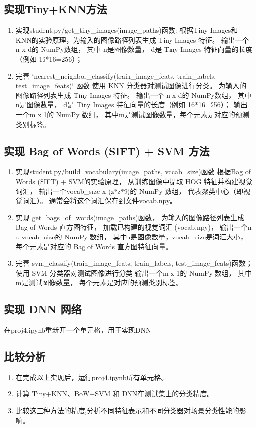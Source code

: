 \subsection{实现Tiny+KNN方法}
	\begin{enumerate}
		\item 实现student.py/get_tiny_images(image_paths)函数: 
		根据Tiny Images和KNN的实验原理，为输入的图像路径列表生成 Tiny Images 特征。
		输出一个 n x d的 NumPy数组，
		其中 n是图像数量，
		d是 Tiny Images 特征向量的长度（例如 16*16=256）；

		\item 完善 `nearest_neighbor_classify(train_image_feats, train_labels, test_image_feats)` 函数
		使用 KNN 分类器对测试图像进行分类。
		为输入的图像路径列表生成 Tiny Images 特征。
		输出一个 n x d的 NumPy数组，
		其中 n是图像数量，
		d是 Tiny Images 特征向量的长度（例如 16*16=256）；
		输出一个m x 1的 NumPy 数组，
		其中m是测试图像数量，每个元素是对应的预测类别标签。

	\end{enumerate}


\subsection{实现 Bag of Words (SIFT) + SVM 方法}
	\begin{enumerate}
		\item 实现student.py/build_vocabulary(image_paths, vocab_size)函数
		根据Bag of Words (SIFT) + SVM的实验原理，
		从训练图像中提取 HOG 特征并构建视觉词汇，
		输出一个vocab_size x (z*z*9)的 NumPy 数组，
		代表聚类中心（即视觉词汇）。
		通常会将这个词汇保存到文件vocab.npy。

		\item 实现 get_bags_of_words(image_paths)函数，
		为输入的图像路径列表生成 Bag of Words 直方图特征，
		加载已构建的视觉词汇 (vocab.npy)，
		输出一个n x vocab_size的 NumPy 数组，
		其中n是图像数量，vocab_size是词汇大小，
		每个元素是对应的 Bag of Words 直方图特征向量。

		\item 完善 svm_classify(train_image_feats, train_labels, test_image_feats)函数；
		使用 SVM 分类器对测试图像进行分类
		输出一个m x 1的 NumPy 数组，
		其中m是测试图像数量，
		每个元素是对应的预测类别标签。
	\end{enumerate}


\subsection{实现 DNN 网络}
在proj4.ipynb重新开一个单元格，用于实现DNN

\subsection{比较分析}
	\begin{enumerate}
		\item 在完成以上实现后，运行proj4.ipynb所有单元格。
		\item 计算 Tiny+KNN、BoW+SVM 和 DNN在测试集上的分类精度。
		\item 比较这三种方法的精度,分析不同特征表示和不同分类器对场景分类性能的影响。
	\end{enumerate}
    